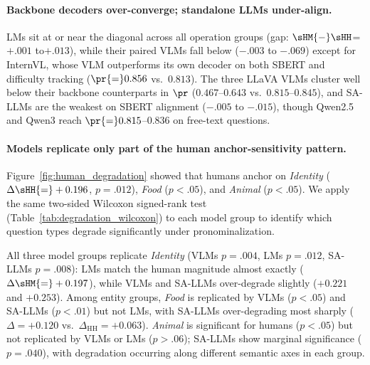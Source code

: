 \paragraph{Backbone decoders over-converge; standalone LLMs under-align.}
LMs sit at or near the diagonal across all operation groups (gap: $\sHM{-}\sHH$=${+.001}$ to${+.013}$), while their paired VLMs fall below (${-.003}$ to ${-.069}$) except for InternVL, whose VLM outperforms its own decoder on both SBERT and difficulty tracking ($\pr{=}0.856$ vs.\ $0.813$).
The three LLaVA VLMs cluster well below their backbone counterparts in $\pr$ ($0.467$--$0.643$ vs.\ $0.815$--$0.845$), and SA-LLMs are the weakest on SBERT alignment (${-.005}$ to ${-.015}$), though Qwen2.5 and Qwen3 reach $\pr{=}0.815$--$0.836$ on free-text questions.

\paragraph{Models replicate only part of the human anchor-sensitivity pattern.}
Figure~\ref{fig:human_degradation} showed that humans anchor on \textit{Identity} ($\Delta\sHH{=}+0.196$, $p{=}.012$), \textit{Food} ($p{<}.05$), and \textit{Animal} ($p{<}.05$).
We apply the same two-sided Wilcoxon signed-rank test (Table~\ref{tab:degradation_wilcoxon}) to each model group to identify which question types degrade significantly under pronominalization.

All three model groups replicate \textit{Identity} (VLMs $p{=}.004$, LMs $p{=}.012$, SA-LLMs $p{=}.008$): LMs match the human magnitude almost exactly ($\Delta\sHM{=}+0.197$), while VLMs and SA-LLMs over-degrade slightly ($+0.221$ and $+0.253$).
Among entity groups, \textit{Food} is replicated by VLMs ($p{<}.05$) and SA-LLMs ($p{<}.01$) but not LMs, with SA-LLMs over-degrading most sharply ($\Delta{=}+0.120$ vs.\ $\Delta_\text{HH}{=}+0.063$).
\textit{Animal} is significant for humans ($p{<}.05$) but not replicated by VLMs or LMs ($p{>}.06$); SA-LLMs show marginal significance ($p{=}.040$), with degradation occurring along different semantic axes in each group.


